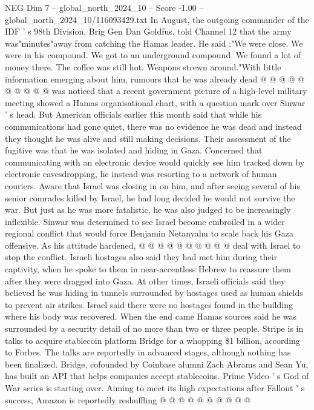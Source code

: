 \begin{textsample}{NEG Dim 7 – global\_north\_2024\_10 – Score -1.00 – global\_north\_2024\_10/116093429.txt}
In August, the outgoing commander of the IDF ' s 98th Division, Brig Gen Dan Goldfus, told Channel 12 that the army was"minutes"away from catching the Hamas leader.
He said :"We were close.
We were in his compound.
We got to an underground compound.
We found a lot of money there.
The coffee was still hot.
Weapons strewn around."With little information emerging about him, rumours that he was already dead @ @ @ @ @ @ @ @ @ @ was noticed that a recent government picture of a high-level military meeting showed a Hamas organisational chart, with a question mark over Sinwar ' s head.
But American officials earlier this month said that while his communications had gone quiet, there was no evidence he was dead and instead they thought he was alive and still making decisions.
Their assessment of the fugitive was that he was isolated and hiding in Gaza.
Concerned that communicating with an electronic device would quickly see him tracked down by electronic eavesdropping, he instead was resorting to a network of human couriers.
Aware that Israel was closing in on him, and after seeing several of his senior comrades killed by Israel, he had long decided he would not survive the war.
But just as he was more fatalistic, he was also judged to be increasingly inflexible.
Sinwar was determined to see Israel become embroiled in a wider regional conflict that would force Benjamin Netanyahu to scale back his Gaza offensive.
As his attitude hardened, @ @ @ @ @ @ @ @ @ @ deal with Israel to stop the conflict.
Israeli hostages also said they had met him during their captivity, when he spoke to them in near-accentless Hebrew to reassure them after they were dragged into Gaza.
At other times, Israeli officials said they believed he was hiding in tunnels surrounded by hostages used as human shields to prevent air strikes.
Israel said there were no hostages found in the building where his body was recovered.
When the end came Hamas sources said he was surrounded by a security detail of no more than two or three people.
Stripe is in talks to acquire stablecoin platform Bridge for a whopping \$1 billion, according to Forbes.
The talks are reportedly in advanced stages, although nothing has been finalized.
Bridge, cofounded by Coinbase alumni Zach Abrams and Sean Yu, has built an API that helps companies accept stablecoins.
Prime Video ' s God of War series is starting over.
Aiming to meet its high expectations after Fallout ' s success, Amazon is reportedly reshuffling @ @ @ @ @ @ @ @ @ @

\end{textsample}
